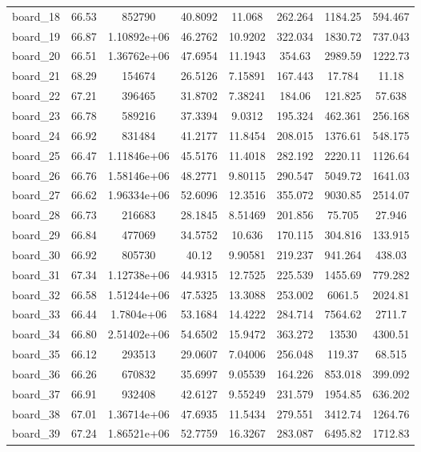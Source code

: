 \begin{table*}[!htbp]
\begin{center}
{\begin{tabular}{|c|c|cccc|cc|}
board\_18 & 66.53 & 852790 & 40.8092 & 11.068 & 262.264 & 1184.25 & 594.467 \\
board\_19 & 66.87 & 1.10892e+06 & 46.2762 & 10.9202 & 322.034 & 1830.72 & 737.043 \\
board\_20 & 66.51 & 1.36762e+06 & 47.6954 & 11.1943 & 354.63 & 2989.59 & 1222.73 \\
board\_21 & 68.29 & 154674 & 26.5126 & 7.15891 & 167.443 & 17.784 & 11.18 \\
board\_22 & 67.21 & 396465 & 31.8702 & 7.38241 & 184.06 & 121.825 & 57.638 \\
board\_23 & 66.78 & 589216 & 37.3394 & 9.0312 & 195.324 & 462.361 & 256.168 \\
board\_24 & 66.92 & 831484 & 41.2177 & 11.8454 & 208.015 & 1376.61 & 548.175 \\
board\_25 & 66.47 & 1.11846e+06 & 45.5176 & 11.4018 & 282.192 & 2220.11 & 1126.64 \\
board\_26 & 66.76 & 1.58146e+06 & 48.2771 & 9.80115 & 290.547 & 5049.72 & 1641.03 \\
board\_27 & 66.62 & 1.96334e+06 & 52.6096 & 12.3516 & 355.072 & 9030.85 & 2514.07 \\
board\_28 & 66.73 & 216683 & 28.1845 & 8.51469 & 201.856 & 75.705 & 27.946 \\
board\_29 & 66.84 & 477069 & 34.5752 & 10.636 & 170.115 & 304.816 & 133.915 \\
board\_30 & 66.92 & 805730 & 40.12 & 9.90581 & 219.237 & 941.264 & 438.03 \\
board\_31 & 67.34 & 1.12738e+06 & 44.9315 & 12.7525 & 225.539 & 1455.69 & 779.282 \\
board\_32 & 66.58 & 1.51244e+06 & 47.5325 & 13.3088 & 253.002 & 6061.5 & 2024.81 \\
board\_33 & 66.44 & 1.7804e+06 & 53.1684 & 14.4222 & 284.714 & 7564.62 & 2711.7 \\
board\_34 & 66.80 & 2.51402e+06 & 54.6502 & 15.9472 & 363.272 & 13530 & 4300.51 \\
board\_35 & 66.12 & 293513 & 29.0607 & 7.04006 & 256.048 & 119.37 & 68.515 \\
board\_36 & 66.26 & 670832 & 35.6997 & 9.05539 & 164.226 & 853.018 & 399.092 \\
board\_37 & 66.91 & 932408 & 42.6127 & 9.55249 & 231.579 & 1954.85 & 636.202 \\
board\_38 & 67.01 & 1.36714e+06 & 47.6935 & 11.5434 & 279.551 & 3412.74 & 1264.76 \\
board\_39 & 67.24 & 1.86521e+06 & 52.7759 & 16.3267 & 283.087 & 6495.82 & 1712.83 \\

\end{tabular}}
\end{center}
\end{table*}
